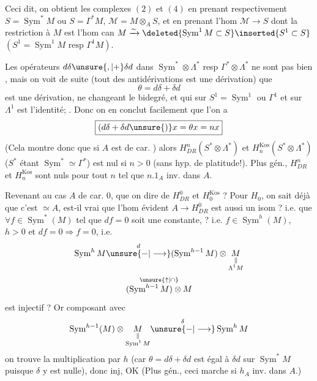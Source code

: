 Ceci dit, on obtient les complexes $(2)$ et $(4)$ en prenant respectivement $S=\operatorname{Sym}^*M$ ou $S=\Gamma^*M$, $\mathcal M=M\otimes_A S$, et en prenant l'hom $\mathcal M\longrightarrow S$  dont la restriction à $M$ est l'hom can $M\xrightarrow{\sim}\deleted{\operatorname{Sym}^1M\subset S}\inserted{S^1\subset S}$  $(S^1=\operatorname{Sym}^1M\text{ resp }\Gamma^1M)$.

Les opérateurs $d\delta\unsure{,|+}\delta d$ dans $\operatorname{Sym}^*\otimes\Lambda^*$ resp $\Gamma^*\otimes\Lambda^*$ ne sont pas bien , mais on voit de suite (tout  des antidérivations est une dérivation) que
\[
\theta=d\delta+\delta d
\]
est une dérivation,   ne changeant  le bidegré, et qui sur  $S^1=\operatorname{Sym}^1$ ou $\Gamma^1$ et sur $\Lambda^1$ est l'identité; . Donc on en conclut facilement que l'on a
\[
\boxed{(d\delta+\delta d\unsure{)}x=\theta x=nx}
\]
(Cela montre donc que si $A$ est de car. ) alors $H^n_{DR}(S^*\otimes\Lambda^*)$ et $H_n^{\mathrm{Kos}}(S^*\otimes\Lambda^*)$ ($S^*$ étant $\operatorname{Sym}^*\simeq\Gamma^*$) est nul si  $n>0$ (sans hyp. de platitude!). Plus gén., $H^n_{DR}$ et $H_n^{\mathrm{Kos}}$ sont nuls pour tout $n$ tel que $n.1_A$ inv. dans $A$.

Revenant au cas $A$ de car. $0$, que  on dire de $H^0_{DR}$ et $H_0^{\mathrm{Kos}}$ ? Pour $H_0$, on sait déjà que c'est $\simeq A$, est-il vrai que l'hom évident $A\longrightarrow H^0_{DR}$ est aussi un isom ?  i.e. que $\forall f\in\operatorname{Sym}^*(M)$ tel que $df=0$ soit  une constante, ? i.e.  $f\in\operatorname{Sym}^h(M)$, $h>0$ et $df=0\Longrightarrow f=0$, i.e.
\[
\operatorname{Sym}^hM\overset{d}{\unsure{-|\longrightarrow}}(\operatorname{Sym}^{h-1}M)\otimes\underset{\substack{\Vert\\\Lambda^1M}}{M}
\]
\[
\overset{\unsure{\uparrow|\cap}}{(\operatorname{Sym}^{h-1}M)\otimes M}
\]
est injectif ? Or composant avec
\[
\operatorname{Sym}^{h-1}(M)\otimes\underset{\substack{\Vert\\\operatorname{Sym}^1M}}{M}\overset{\delta}{\unsure{-|\longrightarrow}}\operatorname{Sym}^hM
\]
on trouve la multiplication par $h$ (car $\theta=d\delta+\delta d$ est égal à $\delta d$ sur $\operatorname{Sym}^*M$ puisque $\delta$ y est nulle), donc inj, OK (Plus gén., ceci marche si $h_A$ inv. dans $A$.)


